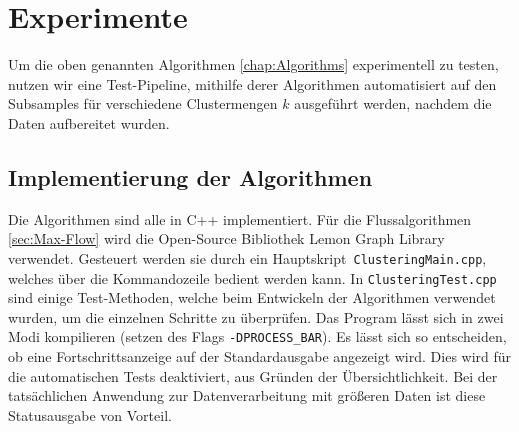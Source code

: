 
\chapter{Experimente} \label{chap:Experimente}
 Um die oben genannten Algorithmen \ref{chap:Algorithms} experimentell zu testen, nutzen wir eine Test-Pipeline, mithilfe derer Algorithmen automatisiert auf den Subsamples für verschiedene Clustermengen $k$ ausgeführt werden, nachdem die Daten aufbereitet wurden. 

\section{Implementierung der Algorithmen}
    Die Algorithmen sind alle in C++ implementiert. Für die Flussalgorithmen \ref{sec:Max-Flow} wird die Open-Source Bibliothek Lemon Graph Library \cite{Lemon-Lib} verwendet. Gesteuert werden sie durch ein Hauptskript\ \verb+ClusteringMain.cpp+, welches über die Kommandozeile bedient werden kann. \newline In \verb+ClusteringTest.cpp+ sind einige Test-Methoden, welche beim Entwickeln der Algorithmen verwendet wurden, um die einzelnen Schritte zu überprüfen. \newline
    Das Program lässt sich in zwei Modi kompilieren (setzen des Flags \verb+-DPROCESS_BAR+). Es lässt sich so entscheiden, ob eine Fortschrittsanzeige auf der Standardausgabe angezeigt wird. Dies wird für die automatischen Tests deaktiviert, aus Gründen der Übersichtlichkeit. Bei der tatsächlichen Anwendung zur Datenverarbeitung mit größeren Daten ist diese Statusausgabe von Vorteil.

